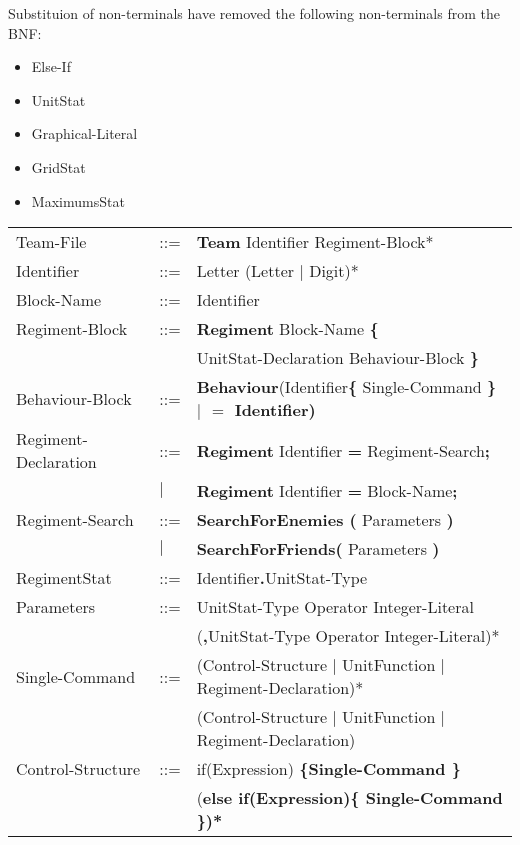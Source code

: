 		Substituion of non-terminals have removed the following non-terminals from the BNF: \\
		\begin{itemize}
			\item Else-If
			\item UnitStat
			\item Graphical-Literal
			\item GridStat
			\item MaximumsStat
		\end{itemize}
		
		\begin{center}
			\begin{longtable}{ l l l }
				\endfirsthead
				\endhead
		Team-File					&	::=	&{\bf Team} Identifier Regiment-Block*\\
		Identifier					&	::=	&Letter (Letter $\mid$ Digit)*\\
		Block-Name					&	::=	&Identifier\\
		Regiment-Block				&	::=	&{\bf Regiment} Block-Name {\bf \{ } \\
									&		&UnitStat-Declaration Behaviour-Block \bf{\} }\\
		Behaviour-Block				&	::=	&{\bf Behaviour}(Identifier{\bf \{ }Single-Command \bf{\} } $\mid$ {\bf $=$} Identifier)\\
		Regiment-Declaration		&	::=	&{\bf Regiment} Identifier {\bf =} Regiment-Search{\bf ;}\\
									&$\mid$	&{\bf Regiment} Identifier {\bf =} Block-Name{\bf ;}\\
		Regiment-Search				&	::=	&{\bf SearchForEnemies (} Parameters {\bf )}\\
									&$\mid$	&{\bf SearchForFriends(} Parameters {\bf )}\\
		RegimentStat				&	::=	&Identifier{\bf.}UnitStat-Type \\
		Parameters					&	::=	&UnitStat-Type Operator Integer-Literal\\
									&		&({\bf ,}UnitStat-Type Operator Integer-Literal)*\\
		Single-Command				&	::=	&(Control-Structure $\mid$ UnitFunction $\mid$ Regiment-Declaration)*\\
									&		&(Control-Structure $\mid$ UnitFunction $\mid$ Regiment-Declaration)\\		
		Control-Structure			&	::=	&if(Expression) \bf{\{}Single-Command \bf{\}}\\
									&		&(\bf{else if(}Expression\bf{)\{ }Single-Command\bf{ \}})* \\

\end{longtable}
\end{center}
